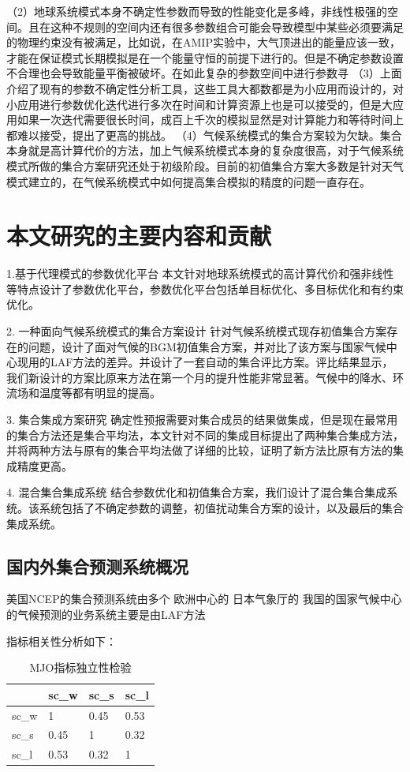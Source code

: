 （2）地球系统模式本身不确定性参数而导致的性能变化是多峰，非线性极强的空间。且在这种不规则的空间内还有很多参数组合可能会导致模型中某些必须要满足的物理约束没有被满足，比如说，在AMIP实验中，大气顶进出的能量应该一致，才能在保证模式长期模拟是在一个能量守恒的前提下进行的。但是不确定参数设置不合理也会导致能量平衡被破坏。在如此复杂的参数空间中进行参数寻
（3）上面介绍了现有的参数不确定性分析工具，这些工具大都数都是为小应用而设计的，对小应用进行参数优化迭代进行多次在时间和计算资源上也是可以接受的，但是大应用如果一次迭代需要很长时间，成百上千次的模拟显然是对计算能力和等待时间上都难以接受，提出了更高的挑战。
（4）气候系统模式的集合方案较为欠缺。集合本身就是高计算代价的方法，加上气候系统模式本身的复杂度很高，对于气候系统模式所做的集合方案研究还处于初级阶段。目前的初值集合方案大多数是针对天气模式建立的，在气候系统模式中如何提高集合模拟的精度的问题一直存在。

\section{本文研究的主要内容和贡献}
\label{sec:bib}
1.基于代理模式的参数优化平台
本文针对地球系统模式的高计算代价和强非线性等特点设计了参数优化平台，参数优化平台包括单目标优化、多目标优化和有约束优化。

2. 一种面向气候系统模式的集合方案设计
针对气候系统模式现存初值集合方案存在的问题，设计了面对气候的BGM初值集合方案，并对比了该方案与国家气候中心现用的LAF方法的差异。并设计了一套自动的集合评比方案。评比结果显示，我们新设计的方案比原来方法在第一个月的提升性能非常显著。气候中的降水、环流场和温度等都有明显的提高。

3. 集合集成方案研究
确定性预报需要对集合成员的结果做集成，但是现在最常用的集合方法还是集合平均法，本文针对不同的集成目标提出了两种集合集成方法，并将两种方法与原有的集合平均法做了详细的比较，证明了新方法比原有方法的集成精度更高。

4. 混合集合集成系统
结合参数优化和初值集合方案，我们设计了混合集合集成系统。该系统包括了不确定参数的调整，初值扰动集合方案的设计，以及最后的集合集成系统。



\subsection{国内外集合预测系统概况}
美国NCEP的集合预测系统由多个
欧洲中心的
日本气象厅的
我国的国家气候中心的气候预测的业务系统主要是由LAF方法


指标相关性分析如下：
\begin{table}[htb]
\centering
\caption{MJO指标独立性检验}  
\begin{tabular}{llll}  
\toprule[1.5pt]
\centering
  & sc\_w & sc\_s & sc\_l  \\  
\hline  
    sc\_w    & 1        & 0.45     & 0.53 \\
    sc\_s    & 0.45     & 1        & 0.32 \\
    sc\_l    & 0.53     & 0.32     & 1 \\
\bottomrule[1.5pt]  
\end{tabular}  
\end{table}



